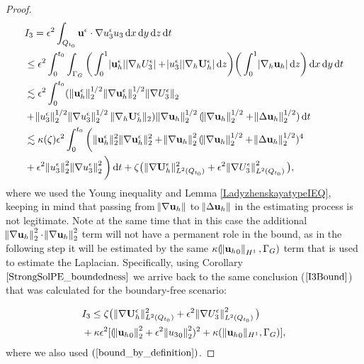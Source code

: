 \documentclass[11pt]{article}
\newcommand*\diff{\mathop{}\!\mathrm{d}}
\begin{document}
\begin{proof}
\begin{equation}
\begin{split}
& I_3 = \epsilon^2 \int_{Q_{t_0}} \mathbf{u}^\epsilon \cdot \nabla u_3^\epsilon u_3 \diff x \diff y \diff z \diff t \\
& \leq \epsilon^2 \int_0^{t_0} \int_{\Gamma_G} \bigg ( \int_0^1 \abs{\mathbf{u}_h^\epsilon} \abs{\nabla_h U_3^\epsilon} + \abs{u_3^\epsilon} \abs{\nabla_h \mathbf{U}_h^\epsilon}\diff z \bigg) \bigg ( \int_0^1 \abs{\nabla_h \mathbf{u}_h} \diff z \bigg ) \diff x \diff y \diff t \\
& \lesssim \epsilon^2 \int_0^{t_0} ( \| \mathbf{u}_h^\epsilon \| _2^{1/2} \| \nabla\mathbf{u}_h^\epsilon \| _2^{1/2} \norm{\nabla U_3^\epsilon}_2 \\
& + \norm{u_3^\epsilon}_2^{1/2} \norm{\nabla u_3^\epsilon}_2^{1/2} \| \nabla_h \mathbf{U}_h^\epsilon \|_2) \norm{\nabla \mathbf{u}_h }_2^{1/2} (\norm{\nabla \mathbf{u}_h}_2^{1/2} + \norm{\Delta \mathbf{u}_h}_2^{1/2}) \diff t \\
& \lesssim \kappa(\zeta) \epsilon^2 \int_0 ^ {t_0} \bigg ( \| \mathbf{u}_h^\epsilon \| _2^2 \| \nabla \mathbf{u}_h^\epsilon \|_2^2 + \norm{\nabla \mathbf{u}_h}_2^2 (\norm{\nabla \mathbf{u}_h}_2^{1/2} + \norm{\Delta \mathbf{u}_h}_2^{1/2})^4 \\
& + \epsilon^2 \norm{u_3^\epsilon}_2^2 \norm{\nabla u_3^\epsilon}_2^2 \bigg ) \diff t + \zeta \big ( \| \nabla \mathbf{U}_h^\epsilon \|_{L^2(Q_{t_0})}^2 + \epsilon^2 \norm{\nabla U_3^\epsilon}_{L^2(Q_{t_0})}^2 \big),
\end{split}
\end{equation}
%
where we used the Young inequality and Lemma \ref{LadyzhenskayatypeIEQ}, keeping in mind that passing from $\norm{\nabla \mathbf{u}_h}$ to $\norm{\Delta \mathbf{u}_h}$ in the estimating process is not legitimate. Note at the same time that in this case the additional $\norm{\nabla \mathbf{u}_h}_2^2 \cdot \norm{\nabla \mathbf{u}_h}_2^2$ term will not have a permanent role in the bound, as in the following step it will be estimated by the same $\kappa (\norm{{\mathbf{u}_h}_0}_{H^1}, \Gamma_G)$ term that is used to estimate the Laplacian. Specifically, using Corollary $\ref{StrongSolPE_boundedness}$ we arrive back to the same conclusion ($\ref{I3Bound}$) that was calculated for the boundary-free scenario:

\begin{equation} \label{I3Bound}
\begin{split}
& I_3 \leq \zeta \big ( \| \nabla \mathbf{U}_h^\epsilon \| _{L^2(Q_{t_0})}^2 + \epsilon^2 \norm{\nabla U_3^\epsilon}_{L^2(Q_{t_0})}^2 \big )\\
& + \kappa \epsilon^2 [(\norm{{\mathbf{u}_h}_0}_2^2 + \epsilon^2 \norm{{u_3}_0}_2^2)^2 + \kappa( \| {\mathbf{u}_h}_0 \| _{H^1}, \Gamma_G)],
\end{split}
\end{equation}
%
where we also used $(\ref{bound_by_definition})$.


\end{proof}
\end{document}
